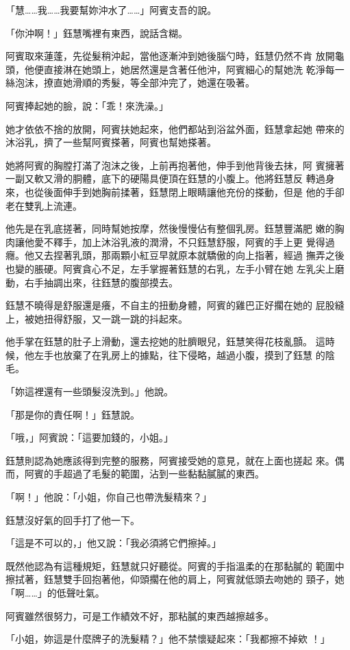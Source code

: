 「慧……我……我要幫妳沖水了……」阿賓支吾的說。

「你沖啊！」鈺慧嘴裡有東西，說話含糊。

阿賓取來蓮蓬，先從髮稍沖起，當他逐漸沖到她後腦勺時，鈺慧仍然不肯
放開龜頭，他便直接淋在她頭上，她居然還是含著任他沖，阿賓細心的幫她洗
乾淨每一絲泡沫，撩直她滑順的秀髮，等全部沖完了，她還在吸著。

阿賓捧起她的臉，說：「乖！來洗澡。」

她才依依不捨的放開，阿賓扶她起來，他們都站到浴盆外面，鈺慧拿起她
帶來的沐浴乳，擠了一些幫阿賓搽著，阿賓也幫她搽著。

她將阿賓的胸膛打滿了泡沫之後，上前再抱著他，伸手到他背後去抹，阿
賓擁著一副又軟又滑的胴體，底下的硬陽具便頂在鈺慧的小腹上。他將鈺慧反
轉過身來，也從後面伸手到她胸前揉著，鈺慧閉上眼睛讓他充份的搽動，但是
他的手卻老在雙乳上流連。

他先是在乳底搓著，同時幫她按摩，然後慢慢佔有整個乳房。鈺慧豐滿肥
嫩的胸肉讓他愛不釋手，加上沐浴乳液的潤滑，不只鈺慧舒服，阿賓的手上更
覺得過癮。他又去捏著乳頭，那兩顆小紅豆早就原本就驕傲的向上指著，經過
撫弄之後也變的脹硬。阿賓貪心不足，左手掌握著鈺慧的右乳，左手小臂在她
左乳尖上磨動，右手抽調出來，往鈺慧的腹部摸去。

鈺慧不曉得是舒服還是癢，不自主的扭動身體，阿賓的雞巴正好擱在她的
屁股縫上，被她扭得舒服，又一跳一跳的抖起來。

他手掌在鈺慧的肚子上滑動，還去挖她的肚臍眼兒，鈺慧笑得花枝亂顫。
這時候，他左手也放棄了在乳房上的據點，往下侵略，越過小腹，摸到了鈺慧
的陰毛。

「妳這裡還有一些頭髮沒洗到。」他說。

「那是你的責任啊！」鈺慧說。

「哦，」阿賓說：「這要加錢的，小姐。」

鈺慧則認為她應該得到完整的服務，阿賓接受她的意見，就在上面也搓起
來。偶而，阿賓的手超過了毛髮的範圍，沾到一些黏黏膩膩的東西。

「啊！」他說：「小姐，你自己也帶洗髮精來？」

鈺慧沒好氣的回手打了他一下。

「這是不可以的，」他又說：「我必須將它們擦掉。」

既然他認為有這種規矩，鈺慧就只好聽從。阿賓的手指溫柔的在那黏膩的
範圍中擦拭著，鈺慧雙手回抱著他，仰頭擱在他的肩上，阿賓就低頭去吻她的
頸子，她「啊……」的低聲吐氣。

阿賓雖然很努力，可是工作績效不好，那粘膩的東西越擦越多。

「小姐，妳這是什麼牌子的洗髮精？」他不禁懷疑起來：「我都擦不掉欸
！」

